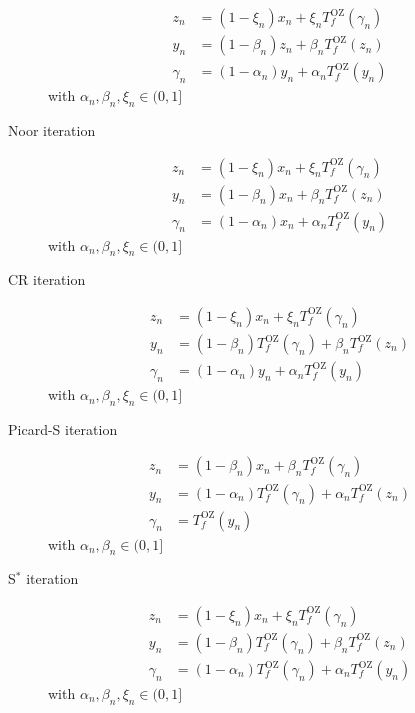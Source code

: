 \begin{description}
\begin{align}
z_n      &= (1-\xi_n)    x_n + \xi_n    T^\mathrm{OZ}_f(\gamma_{n}) \\
y_n      &= (1-\beta_n)  z_n + \beta_n  T^\mathrm{OZ}_f(z_{n}) \\
\gamma_n &= (1-\alpha_n) y_n + \alpha_n T^\mathrm{OZ}_f(y_{n})
\end{align}
with $\alpha_n,\beta_n,\xi_n \in (0,1]$
\item[Noor iteration \cite{Noor2000}]
\begin{align}
z_n      &= (1-\xi_n)    x_n + \xi_n    T^\mathrm{OZ}_f(\gamma_{n}) \\
y_n      &= (1-\beta_n)  x_n + \beta_n  T^\mathrm{OZ}_f(z_{n}) \\
\gamma_n &= (1-\alpha_n) x_n + \alpha_n T^\mathrm{OZ}_f(y_{n})
\end{align}
with $\alpha_n,\beta_n,\xi_n \in (0,1]$
\item[CR iteration \cite{Chugh2012}]
\begin{align}
z_n      &= (1-\xi_n)    x_n + \xi_n    T^\mathrm{OZ}_f(\gamma_{n}) \\
y_n      &= (1-\beta_n)  T^\mathrm{OZ}_f(\gamma_{n}) + \beta_n  T^\mathrm{OZ}_f(z_{n}) \\
\gamma_n &= (1-\alpha_n) y_n + \alpha_n T^\mathrm{OZ}_f(y_{n})
\end{align}
with $\alpha_n,\beta_n,\xi_n \in (0,1]$
\item[Picard-S iteration \cite{Gursoy2014}]
\begin{align}
z_n      &= (1-\beta_n)    x_n + \beta_n    T^\mathrm{OZ}_f(\gamma_{n}) \\
y_n      &= (1-\alpha_n)  T^\mathrm{OZ}_f(\gamma_{n}) + \alpha_n  T^\mathrm{OZ}_f(z_{n}) \\
\gamma_n &= T^\mathrm{OZ}_f(y_{n})
\end{align}
with $\alpha_n,\beta_n \in (0,1]$
\item[S$^*$ iteration \cite{Karahan2013}]
\begin{align}
z_n      &= (1-\xi_n)    x_n + \xi_n    T^\mathrm{OZ}_f(\gamma_{n}) \\
y_n      &= (1-\beta_n)  T^\mathrm{OZ}_f(\gamma_{n}) + \beta_n  T^\mathrm{OZ}_f(z_{n}) \\
\gamma_n &= (1-\alpha_n) T^\mathrm{OZ}_f(\gamma_{n}) + \alpha_n T^\mathrm{OZ}_f(y_{n})
\end{align}
with $\alpha_n,\beta_n,\xi_n \in (0,1]$
\end{description}
